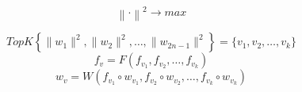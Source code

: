 \documentclass{article}
\begin{document}
$$\left\lVert \cdot \right\rVert^2 \to max$$

$$TopK \left\lbrace \lVert  w_1 \rVert^2, \lVert w_2 \rVert^2, \dots, \lVert  w_{2n-1} \rVert^2 \right\rbrace = \{v_1, v_2, \dots, v_k\}$$
$$f_v = F(f_{v_1}, f_{v_2}, \dots, f_{v_k})$$
$$w_v = W(f_{v_1} \circ w_{v_1}, f_{v_2} \circ w_{v_2}, \dots, f_{v_k} \circ w_{v_k})$$
\end{document}
